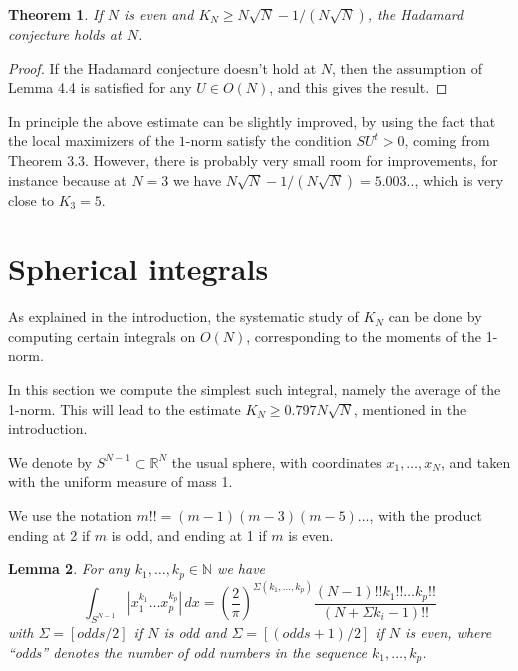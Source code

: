 \documentclass[12pt]{amsart}
\newtheorem{theorem}{Theorem}[section]
\newtheorem{lemma}[theorem]{Lemma}
\begin{document}
\begin{theorem}
If $N$ is even and $K_N\geq N\sqrt{N}-1/(N\sqrt{N})$, the Hadamard conjecture holds at $N$.
\end{theorem}

\begin{proof}
If the Hadamard conjecture doesn't hold at $N$, then the assumption of Lemma 4.4 is satisfied for any $U\in O(N)$, and this gives the result.
\end{proof}

In principle the above estimate can be slightly improved, by using the fact that the local maximizers of the $1$-norm satisfy the condition $SU^t>0$, coming from Theorem 3.3. However, there is probably very small room for improvements, for instance because at $N=3$ we have $N\sqrt{N}-1/(N\sqrt{N})=5.003..$, which is very close to $K_3=5$.

\section{Spherical integrals}

As explained in the introduction, the systematic study of $K_N$ can be done by computing certain integrals on $O(N)$, corresponding to the moments of the 1-norm. 

In this section we compute the simplest such integral, namely the average of the 1-norm. This will lead to the estimate $K_N\geq 0.797N\sqrt{N}$, mentioned in the introduction.

We denote by $S^{N-1}\subset\mathbb R^N$ the usual sphere, with coordinates $x_1,\ldots,x_N$, and taken with the uniform measure of mass 1. 

We use the notation $m!!=(m-1)(m-3)(m-5)\ldots$, with the product ending at 2 if $m$ is odd, and ending at 1 if $m$ is even.

\begin{lemma}
For any $k_1,\ldots,k_p\in\mathbb N$ we have
$$\int_{S^{N-1}}\left|x_1^{k_1}\ldots x_p^{k_p}\right|\,dx=\left(\frac{2}{\pi}\right)^{\Sigma(k_1,\ldots,k_p)}\frac{(N-1)!!k_1!!\ldots k_p!!}{(N+\Sigma k_i-1)!!}$$
with $\Sigma=[odds/2]$ if $N$ is odd and $\Sigma=[(odds+1)/2]$ if $N$ is even, where ``odds'' denotes the number of odd numbers in the sequence $k_1,\ldots,k_p$.
\end{lemma}
\end{document}
